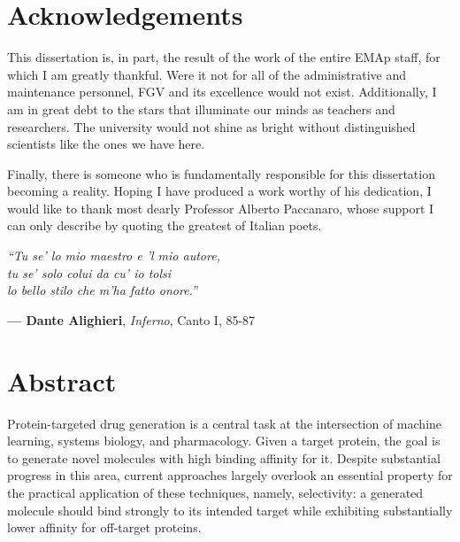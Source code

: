 \documentclass[a4paper,12pt]{article}
\begin{document}
\newpage
\section*{Acknowledgements}
This dissertation is, in part, the result of the work of the entire EMAp staff, for which I am greatly thankful. Were it not for all of the administrative and maintenance personnel, FGV and its excellence would not exist. Additionally, I am in great debt to the stars that illuminate our minds as teachers and researchers. The university would not shine as bright without distinguished scientists like the ones we have here.

Finally, there is someone who is fundamentally responsible for this dissertation becoming a reality. Hoping I have produced a work worthy of his dedication, I would like to thank most dearly Professor Alberto Paccanaro, whose support I can only describe by quoting the greatest of Italian poets.\par
\begin{center}
    \parbox{8cm}{
        \onehalfspacing
        \itshape
        ``Tu se' lo mio maestro e 'l mio autore,\\
        tu se' solo colui da cu' io tolsi\\
        lo bello stilo che m'ha fatto onore.''

        \vspace{0.5cm}

        \raggedleft
        \upshape
        \textbf{--- Dante Alighieri}, \textit{Inferno},
        Canto I, 85-87\footnotemark
    }
\end{center}


\thispagestyle{empty}

\newpage
\section*{Abstract}
Protein-targeted drug generation is a central task at the intersection of machine learning, systems biology, and pharmacology. Given a target protein, the goal is to generate novel molecules with high binding affinity for it. Despite substantial progress in this area, current approaches largely overlook an essential property for the practical application of these techniques, namely, selectivity: a generated molecule should bind strongly to its intended target while exhibiting substantially lower affinity for off-target proteins.
\end{document}
